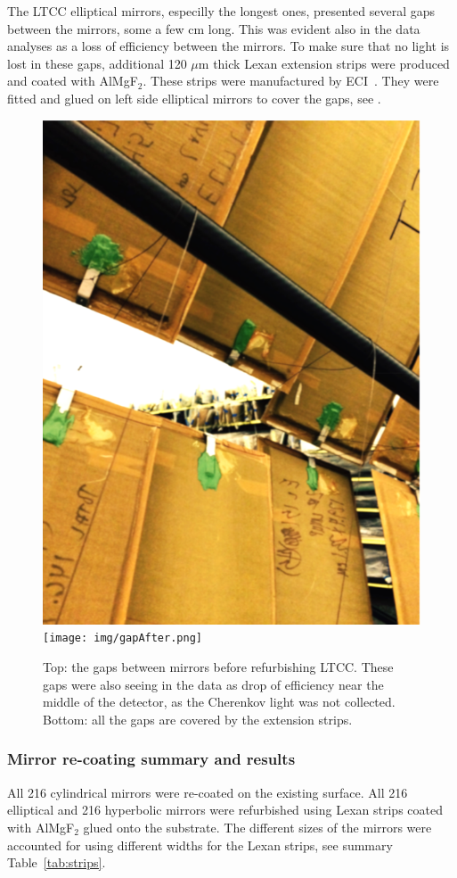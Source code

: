 The LTCC elliptical mirrors, especilly the longest ones, presented several gaps between the mirrors, some a few cm long.
This was evident also in the data analyses as a loss of efficiency between the mirrors.
To make sure that no light is lost in these gaps, additional 120 $\mu$m thick Lexan extension strips were produced and coated with AlMgF$_2$.
These strips were manufactured by ECI~\cite{ECI}. They were fitted and glued on left side elliptical mirrors to cover the gaps,
see .

\begin{figure}
\centering
	\includegraphics[width=0.98\columnwidth, height=0.7\columnwidth]{img/gapBefore.png}
	\texttt{[image: img/gapAfter.png]}
	\caption{Top: the gaps between mirrors before refurbishing LTCC. These gaps were also seeing in the data as
			 drop of efficiency near the middle of the detector, as the Cherenkov light was not collected.
             Bottom: all the gaps are covered by the extension strips.}
	\label{fig:gapBeforeAndAfter}
\end{figure}


\subsubsection{Mirror re-coating summary and results}

All 216 cylindrical mirrors were re-coated on the existing surface. All 216 elliptical and 216 hyperbolic mirrors were refurbished using Lexan strips
coated with AlMgF$_2$ glued onto the substrate. The different sizes of the mirrors were accounted for using different widths for the Lexan strips, see
summary Table~\ref{tab:strips}.



